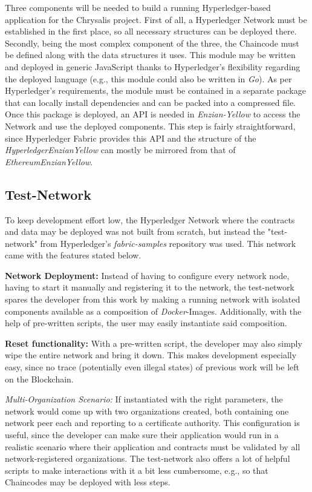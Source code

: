 Three components will be needed to build a running Hyperledger-based application for the Chrysalis project. \newline
First of all, a Hyperledger Network must be established in the first place, so all necessary structures can be deployed there. Secondly, being the most complex component of the three, the Chaincode must be defined along with the data structures it uses. This module may be written and deployed in generic JavaScript thanks to Hyperledger's flexibility regarding the deployed language (e.g., this module could also be written in \emph{Go}). As per Hyperledger's requirements, the module must be contained in a separate package that can locally install dependencies and can be packed into a compressed file. Once this package is deployed, an API is needed in \emph{Enzian-Yellow} to access the Network and use the deployed components. This step is fairly straightforward, since Hyperledger Fabric provides this API and the structure of the \emph{HyperledgerEnzianYellow} can mostly be mirrored from that of \emph{EthereumEnzianYellow}.

\subsection{Test-Network}
\label{sec:impr:hl:network}

To keep development effort low, the Hyperledger Network where the contracts and data may be deployed was not built from scratch, but instead the "test-network" from Hyperledger's \emph{fabric-samples} repository was used. This network came with the features stated below.

\textbf{Network Deployment:} Instead of having to configure every network node, having to start it manually and registering it to the network, the test-network spares the developer from this work by making a running network with isolated components available as a composition of \emph{Docker}-Images. Additionally, with the help of pre-written scripts, the user may easily instantiate said composition.

\textbf{Reset functionality:} With a pre-written script, the developer may also simply wipe the entire network and bring it down. This makes development especially easy, since no trace (potentially even illegal states) of previous work will be left on the Blockchain.

\emph{Multi-Organization Scenario:} If instantiated with the right parameters, the network would come up with two organizations created, both containing one network peer each and reporting to a certificate authority. This configuration is useful, since the developer can make sure their application would run in a realistic scenario where their application and contracts must be validated by all network-registered organizations. The test-network also offers a lot of helpful scripts to make interactions with it a bit less cumbersome, e.g., so that Chaincodes may be deployed with less steps.

